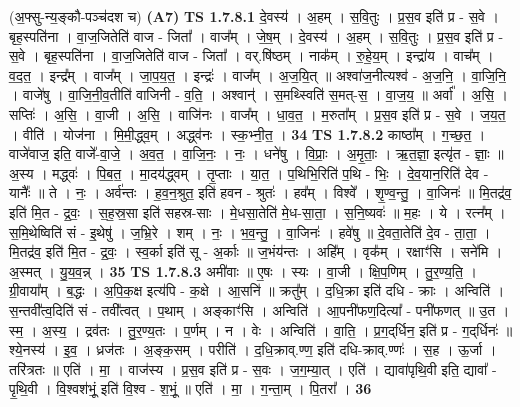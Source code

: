 \documentclass[17pt]{extarticle}
\begin{document}
                  \newline
                      (अ॒फ्सु-न्य॒ङ्कौ-पञ्च॑दश च)  \textbf{(A7)} \newline \newline
                                \textbf{ TS 1.7.8.1} \newline
                  दे॒वस्य॑ । अ॒हम् । स॒वि॒तुः । प्र॒स॒व इति॑ प्र - स॒वे । बृह॒स्पति॑ना । वा॒ज॒जितेति॑ वाज - जिता᳚ । वाज᳚म् । जे॒ष॒म् । दे॒वस्य॑ । अ॒हम् । स॒वि॒तुः । प्र॒स॒व इति॑ प्र - स॒वे । बृह॒स्पति॑ना । वा॒ज॒जितेति॑ वाज - जिता᳚ । वर्.षि॑ष्ठम् । नाक᳚म् । रु॒हे॒य॒म् । इन्द्रा॑य । वाच᳚म् । व॒द॒त॒ । इन्द्र᳚म् । वाज᳚म् । जा॒प॒य॒त॒ । इन्द्रः॑ । वाज᳚म् । अ॒ज॒यि॒त् ॥ अश्वा॑ज॒नीत्यश्व॑ - अ॒ज॒नि॒ । वा॒जि॒नि॒ । वाजे॑षु । वा॒जि॒नी॒व॒तीति॑ वाजिनी - व॒ति॒ । अश्वान्॑ । स॒मथ्स्विति॑ स॒मत्-स॒ । वा॒ज॒य॒ ॥ अर्वा᳚ । अ॒सि॒ । सप्तिः॑ । अ॒सि॒ । वा॒जी । अ॒सि॒ । वाजि॑नः । वाज᳚म् । धा॒व॒त॒ । म॒रुता᳚म् । प्र॒स॒व इति॑ प्र - स॒वे । ज॒य॒त॒ । वीति॑ । योज॑ना । मि॒मी॒द्ध्व॒म् । अद्ध्व॑नः । स्क॒भ्नी॒त॒ । \textbf{  34} \newline
                  \newline
                                \textbf{ TS 1.7.8.2} \newline
                  काष्ठा᳚म् । ग॒च्छ॒त॒ । वाजे॑वाज॒ इति॒ वाजे᳚-वा॒जे॒ । अ॒व॒त॒ । वा॒जि॒नः॒ । नः॒ । धने॑षु । वि॒प्राः॒ । अ॒मृ॒ताः॒ । ऋ॒त॒ज्ञा॒ इत्यृ॑त - ज्ञाः॒ ॥ अ॒स्य । मद्ध्वः॑ । पि॒ब॒त॒ । मा॒दय॑द्ध्वम् । तृ॒प्ताः । या॒त॒ । प॒थिभि॒रिति॑ प॒थि - भिः॒ । दे॒व॒यान॒रिति॑ देव - यानैः᳚ ॥ ते । नः॒ । अर्व॑न्तः । ह॒व॒न॒श्रुत॒ इति॑ हवन - श्रुतः॑ । हव᳚म् । विश्वे᳚ । शृ॒ण्व॒न्तु॒ । वा॒जिनः॑ ॥ मि॒तद्र॑व॒ इति॑ मि॒त - द्र॒वः॒ । स॒ह॒स्र॒सा इति॑ सहस्र-साः । मे॒धसा॒तेति॑ मे॒ध-सा॒ता॒ । स॒नि॒ष्यवः॑ ॥ म॒हः । ये । रत्न᳚म् । स॒मि॒थेष्विति॑ सं - इ॒थेषु॑ । ज॒भ्रि॒रे । शम् । नः॒ । भ॒व॒न्तु॒ । वा॒जिनः॑ । हवे॑षु ॥ दे॒वता॒तेति॑ दे॒व - ता॒ता॒ । मि॒तद्र॑व॒ इति॑ मि॒त - द्र॒वः॒ । स्व॒र्का इति॑ सू - अ॒र्काः ॥ ज॒भंय॑न्तः । अहि᳚म् । वृक᳚म् । रक्षाꣳ॑सि । सने॑मि । अ॒स्मत् । यु॒य॒व॒न्न् । \textbf{  35} \newline
                  \newline
                                \textbf{ TS 1.7.8.3} \newline
                  अमी॑वाः ॥ ए॒षः । स्यः । वा॒जी । क्षि॒प॒णिम् । तु॒र॒ण्य॒ति॒ । ग्री॒वाया᳚म् । ब॒द्धः । अ॒पि॒क॒क्ष इत्य॑पि - क॒क्षे । आ॒सनि॑ ॥ क्रतु᳚म् । द॒धि॒क्रा इति॑ दधि - क्राः । अन्विति॑ । स॒न्तवी᳚त्व॒दिति॑ सं - तवी᳚त्वत् । प॒थाम् । अङ्काꣳ॑सि । अन्विति॑ । आ॒पनी॑फण॒दित्या᳚ - पनी॑फणत् ॥ उ॒त । स्म॒ । अ॒स्य॒ । द्रव॑तः । तु॒र॒ण्य॒तः । प॒र्णम् । न । वेः । अन्विति॑ । वा॒ति॒ । प्र॒ग॒द्‌र्धिन॒ इति॑ प्र - ग॒द्‌र्धिनः॑ ॥ श्ये॒नस्य॑ । इ॒व॒ । ध्रज॑तः । अ॒ङ्क॒सम् । परीति॑ । द॒धि॒क्राव्.ण्ण॒ इति॑ दधि-क्राव्.ण्णः॑ । स॒ह । ऊ॒र्जा । तरि॑त्रतः ॥ एति॑ । मा॒ । वाज॑स्य । प्र॒स॒व इति॑ प्र - स॒वः । ज॒ग॒म्या॒त् । एति॑ । द्यावा॑पृथि॒वी इति॒ द्यावा᳚ - पृ॒थि॒वी । वि॒श्वश॑भूं॒ इति॑ वि॒श्व - श॒भूं॒ ॥ एति॑ । मा॒ । ग॒न्ता॒म् । पि॒तरा᳚ । \textbf{  36} \newline
\end{document}
